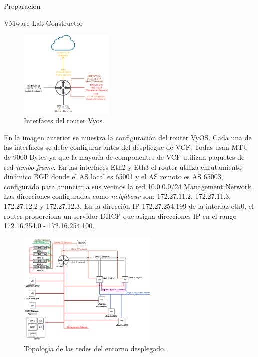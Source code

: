 \begin{subsection}{Preparación}
\begin{subsubsection}{VMware Lab Constructor}
      \begin{figure}[h]
        \centering
        \includegraphics[width=0.4\textwidth]{imaxes/pruebaconcepto/RouterFisicoL3.png}
        \caption{Interfaces del router Vyos.}
        \label{fig:interfaces-router-fisico-L3}
      \end{figure}
      \FloatBarrier
  
      En la imagen anterior se muestra la configuración del router VyOS. Cada una de las interfaces se debe configurar antes del despliegue de VCF. Todas usan MTU de 9000 Bytes ya que la mayoría de componentes de VCF utilizan paquetes de red \textit{jumbo frame}. En las interfaces Eth2 y Eth3 el router utiliza enrutamiento dinámico BGP donde el AS local es 65001 y el AS remoto es AS 65003, configurado para anunciar a sus vecinos la red 10.0.0.0/24 Management Network. Las direcciones configuradas como \textit{neighbour} son: 172.27.11.2, 172.27.11.3, 172.27.12.2 y 172.27.12.3. En la dirección IP 172.27.254.199 de la interfaz eth0, el router proporciona un servidor DHCP que asigna direcciones IP en el rango 172.16.254.0 - 172.16.254.100.
      \FloatBarrier
  
      \begin{figure}[h]
        \centering
        \includegraphics[width=0.6\textwidth]{imaxes/pruebaconcepto/RedDesdeDentro.png}
        \caption{Topología de las redes del entorno desplegado.}
        \label{fig:red-L3-infraestructura-fisica}
      \end{figure}
      \FloatBarrier
  

\end{subsubsection}
\end{subsection}
